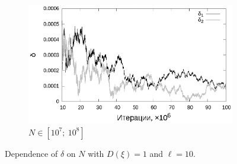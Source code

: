 \documentclass[11pt,a4paper]{article}
\theoremstyle{definition}
\begin{document}
\begin{figure}[h!]
\begin{subfigure}[b]{0.3\textwidth}
    \includegraphics[width=\textwidth]{figs/classic/linear_log_1x_2_samples_10_variance_1_norm.log_end.eps}
    \caption{$N \in [10^7;~10^8]$}
    \label{fig:classic_var1_n10_end}
  \end{subfigure}
  \caption{Dependence of $\delta$ on $N$ with $D(\xi) = 1$ and $\ell = 10$.}
  \label{fig:classic_var1_n10}
\end{figure}
\end{document}
